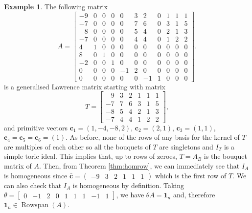 \documentclass[a4paper, 12pt]{article}
\theoremstyle{plain}
\theoremstyle{definition}
\newtheorem{example}[theorem]{Example}
\theoremstyle{remark}
\begin{document}

\begin{example} \label{ex:CIhombad}
    The following matrix 
    $$A=\begin{bmatrix}
-9 & 0 & 0 & 0 & 0 & 3 & 2 & 0 & 1 & 1 & 1 \\
-7 & 0 & 0 & 0 & 0 & 7 & 6 & 0 & 3 & 1 & 5 \\
-8 & 0 & 0 & 0 & 0 & 5 & 4 & 0 & 2 & 1 & 3 \\
-7 & 0 & 0 & 0 & 0 & 4 & 4 & 0 & 1 & 2 & 2 \\
4 & 1 & 0 & 0 & 0 & 0 & 0 & 0 & 0 & 0 & 0 \\
8 & 0 & 1 & 0 & 0 & 0 & 0 & 0 & 0 & 0 & 0 \\
-2 & 0 & 0 & 1 & 0 & 0 & 0 & 0 & 0 & 0 & 0 \\
0 & 0 & 0 & 0 & -1 & 2 & 0 & 0 & 0 & 0 & 0 \\
0 & 0 & 0 & 0 & 0 & 0 & -1 & 1 & 0 & 0 & 0 
\end{bmatrix}.$$
is a generalised Lawrence matrix starting with matrix
    $$
    T=\begin{bmatrix}
    -9&3&2&1&1&1\\
    -7&7&6&3&1&5\\
    -8&5&4&2&1&3\\
    -7&4&4&1&2&2
    \end{bmatrix},
    $$
and primitive vectors $\mathbf{c}_1=(1,-4,-8,2)$, $\mathbf{c}_2=(2,1)$, $\mathbf{c}_3=(1,1)$, $\mathbf{c}_4=\mathbf{c}_5=\mathbf{c}_6=(1)$. As before, none of the rows of any basis for the kernel of $T$ are multiples of each other so all the bouquets of $T$ are singletons and $I_T$ is a simple toric ideal. This implies that, up to rows of zeroes, $T=A_B$ is the bouquet matrix of $A$. Then, from Theorem \ref{thm:homrow}, we can immediately see that $I_A$ is homogeneous since $\mathbf{\bar c}=\begin{pmatrix}-9&3&2&1&1&1\end{pmatrix}$ which is the first row of $T$. We can also check that $I_A$ is homogeneous by definition. Taking  $\theta=\begin{bmatrix}0&-1&2&0&1&1&1&-1&1\end{bmatrix}$, we have $\theta A= \mathbf{1}_n$ and, therefore $\mathbf{1}_n \in \operatorname{Rowspan}(A)$.
    

\end{example}
\end{document}

